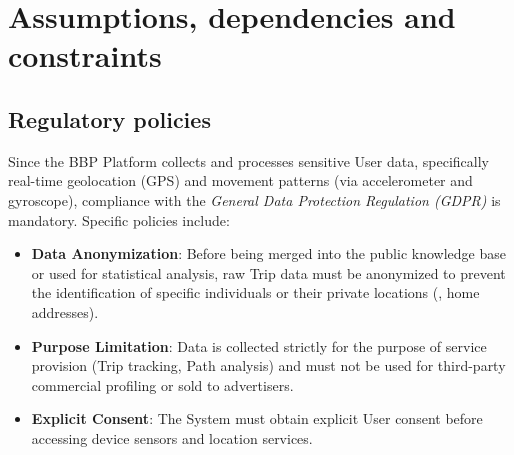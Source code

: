 \section{Assumptions, dependencies and constraints}
\subsection{Regulatory policies}
Since the BBP Platform collects and processes sensitive User data, specifically real-time geolocation (GPS) and movement patterns (via accelerometer and gyroscope), compliance with the \emph{General Data Protection Regulation (GDPR)} is mandatory.
Specific policies include:

\begin{itemize}
    \item \textbf{Data Anonymization}: Before being merged into the public knowledge base or used for statistical analysis, raw Trip data must be anonymized to prevent the identification of specific individuals or their private locations (\eg, home addresses).
    \item \textbf{Purpose Limitation}: Data is collected strictly for the purpose of service provision (Trip tracking, Path analysis) and must not be used for third-party commercial profiling or sold to advertisers.
    \item \textbf{Explicit Consent}: The System must obtain explicit User consent before accessing device sensors and location services.
\end{itemize}

